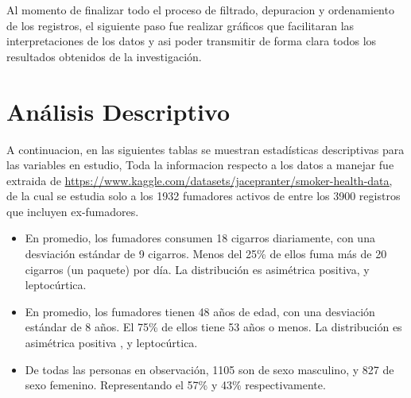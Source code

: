 \documentclass[
  stu,
  longtable,
  nolmodern,
  notxfonts,
  notimes,
  colorlinks=true,linkcolor=blue,citecolor=blue,urlcolor=blue]{apa7}
\begin{document}
Al momento de finalizar todo el proceso de filtrado, depuracion y
ordenamiento de los registros, el siguiente paso fue realizar gráficos
que facilitaran las interpretaciones de los datos y asi poder transmitir
de forma clara todos los resultados obtenidos de la investigación.

\section{Análisis Descriptivo}\label{anuxe1lisis-descriptivo}

A continuacion, en las siguientes tablas se muestran estadísticas
descriptivas para las variables en estudio, Toda la informacion respecto
a los datos a manejar fue extraida de
\url{https://www.kaggle.com/datasets/jacepranter/smoker-health-data,} de
la cual se estudia solo a los 1932 fumadores activos de entre los 3900
registros que incluyen ex-fumadores.

\begin{itemize}
\item
  En promedio, los fumadores consumen 18 cigarros diariamente, con una
  desviación estándar de 9 cigarros. Menos del 25\% de ellos fuma más de
  20 cigarros (un paquete) por día. La distribución es asimétrica
  positiva, y leptocúrtica.
\item
  En promedio, los fumadores tienen 48 años de edad, con una desviación
  estándar de 8 años. El 75\% de ellos tiene 53 años o menos. La
  distribución es asimétrica positiva , y leptocúrtica.
\item
  De todas las personas en observación, 1105 son de sexo masculino, y
  827 de sexo femenino. Representando el 57\% y 43\% respectivamente.
\end{itemize}
\end{document}
